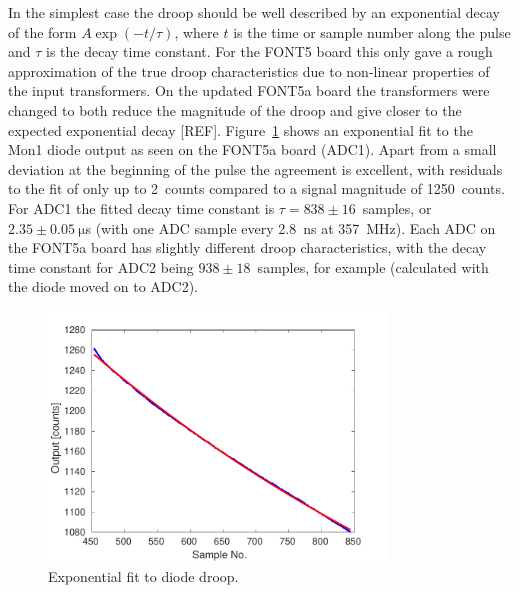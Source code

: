 In the simplest case the droop should be well described by an exponential decay of the form \(A\exp\left(-t/\tau\right)\), where \(t\) is the time or sample number along the pulse and \(\tau\) is the decay time constant. For the FONT5 board this only gave a rough approximation of the true droop characteristics due to non-linear properties of the input transformers. On the updated FONT5a board the transformers were changed to both reduce the magnitude of the droop and give closer to the expected exponential decay [REF]. Figure~\ref{f:iirDiodeFit} shows an exponential fit to the Mon1 diode output as seen on the FONT5a board (ADC1). Apart from a small deviation at the beginning of the pulse the agreement is excellent, with residuals to the fit of only up to 2~counts compared to a signal magnitude of 1250~counts. For ADC1 the fitted decay time constant is \(\tau = 838\pm16\)~samples, or \(2.35\pm0.05~\mathrm{\mu}\)s (with one ADC sample every 2.8~ns at 357~MHz). Each ADC on the FONT5a board has slightly different droop characteristics, with the decay time constant for ADC2 being \(938\pm18\)~samples, for example (calculated with the diode moved on to ADC2).

\begin{figure}
  \centering
  \includegraphics[width=0.8\textwidth]{Figures/commissioning/iirDiodeFit}
  \caption{Exponential fit to diode droop.}
  \label{f:iirDiodeFit}
\end{figure}

